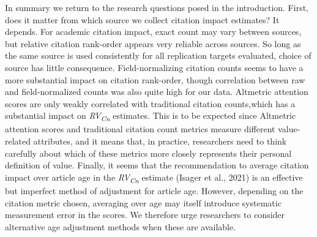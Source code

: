 \documentclass[
  man,floatsintext]{apa6}
\begin{document}
In summary we return to the research questions posed in the introduction. First, does it matter from which source we collect citation impact estimates? It depends. For academic citation impact, exact count may vary between sources, but relative citation rank-order appears very reliable across sources. So long as the same source is used consistently for all replication targets evaluated, choice of source has little consequence. Field-normalizing citation counts seems to have a more substantial impact on citation rank-order, though correlation between raw and field-normalized counts was also quite high for our data. Altmetric attention scores are only weakly correlated with traditional citation counts,which has a substantial impact on \emph{RV\textsubscript{Cn}} estimates. This is to be expected since Altmetric attention scores and traditional citation count metrics measure different value-related attributes, and it means that, in practice, researchers need to think carefully about which of these metrics more closely represents their personal definition of value. Finally, it seems that the recommendation to average citation impact over article age in the \emph{RV\textsubscript{Cn}} estimate (Isager et al., 2021) is an effective but imperfect method of adjustment for article age. However, depending on the citation metric chosen, averaging over age may itself introduce systematic measurement error in the scores. We therefore urge researchers to consider alternative age adjustment methods when these are available.
\end{document}
